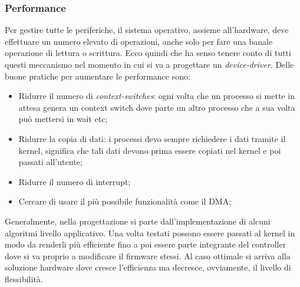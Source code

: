 \subsubsection*{Performance}
Per gestire tutte le periferiche, il sistema operativo, assieme all'hardware, deve effettuare un numero elevato di operazioni, anche solo per fare una banale operazione di lettura o scrittura. Ecco quindi che ha senso tenere conto di tutti questi meccanismo nel momento in cui si va a progettare un \textit{device-driver}. Delle buone pratiche per aumentare le performance sono:
\vspace{-5px}
\begin{itemize}
\setlength{\itemsep}{-.15 em}
    \item Ridurre il numero di \textit{context-switches}: ogni volta che un processo si mette in attesa genera un context switch dove parte un altro processo che a sua volta può mettersi in wait etc;
    \item Ridurre la copia di dati: i processi devo sempre richiedere i dati tramite il kernel, significa che tali dati devono prima essere copiati nel kernel e poi passati all'utente;
    \item Ridurre il numero di interrupt;
    \item Cercare di usare il più possibile funzionalità come il DMA;
\end{itemize}

Generalmente, nella progettazione si parte dall'implementazione di alcuni algoritmi livello applicativo. Una volta testati possono essere passati al kernel in modo da renderli più efficiente fino a poi essere parte integrante del controller dove si va proprio a modificare il firmware stessi. Al caso ottimale si arriva alla soluzione hardware dove cresce l'efficienza ma decresce, ovviamente, il livello di flessibilità.
